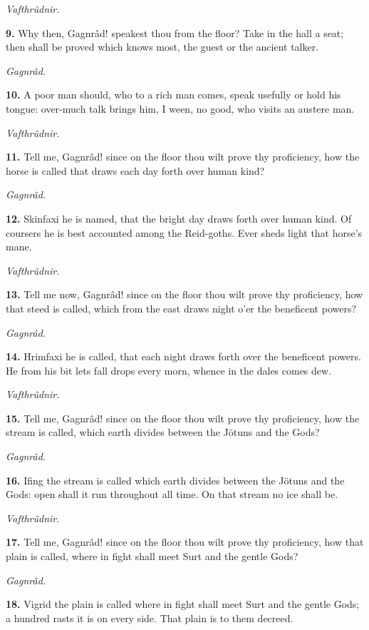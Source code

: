 \emph{Vafthrûdnir.}

\textbf{9.} Why then, Gagnrâd! speakest thou from the floor? Take in the hall
a seat; then shall be proved which knows most, the guest or the
ancient talker.

\emph{Gagnrâd.}

\textbf{10.} A poor man should, who to a rich man comes, speak usefully or
hold his tongue: over-much talk brings him, I ween, no good, who
visits an austere man.

\emph{Vafthrûdnir.}

\textbf{11.} Tell me, Gagnrâd! since on the floor thou wilt prove thy
proficiency, how the horse is called that draws each day forth over
human kind?

\emph{Gagnrâd.}

\textbf{12.} Skinfaxi he is named, that the bright day draws forth over human
kind. Of coursers he is best accounted among the Reid-goths. Ever
sheds light that horse's mane.

\emph{Vafthrûdnir.}

\textbf{13.} Tell me now, Gagnrâd! since on the floor thou wilt prove thy
proficiency, how that steed is called, which from the east draws night
o'er the beneficent powers?

\emph{Gagnrâd.}

\textbf{14.} Hrimfaxi he is called, that each night draws forth over the
beneficent powers. He from his bit lets fall drops every morn, whence
in the dales comes dew.

\emph{Vafthrûdnir.}

\textbf{15.} Tell me, Gagnrâd! since on the floor thou wilt prove thy
proficiency, how the stream is called, which earth divides between the
Jötuns and the Gods?

\emph{Gagnrâd.}

\textbf{16.} Ifing the stream is called which earth divides between the
Jötuns and the Gods: open shall it run throughout all time. On that
stream no ice shall be.

\emph{Vafthrûdnir.}

\textbf{17.} Tell me, Gagnrâd! since on the floor thou wilt prove thy
proficiency, how that plain is called, where in fight shall meet Surt
and the gentle Gods?

\emph{Gagnrâd.}

\textbf{18.} Vigrid the plain is called where in fight shall meet Surt and
the gentle Gods; a hundred rasts it is on every side. That plain is to
them decreed.

